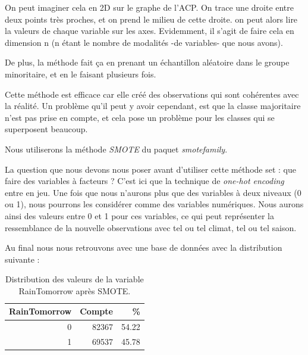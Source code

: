 \documentclass{article}
\begin{document}
On peut imaginer cela en 2D sur le graphe de l'ACP. On trace une droite entre deux points très proches, et on prend le milieu de cette droite. on peut alors lire la valeurs de chaque variable sur les axes. Evidemment, il s'agit de faire cela en dimension n (n étant le nombre de modalités -de variables- que nous avons).

De plus, la méthode fait ça en prenant un échantillon aléatoire dans le groupe minoritaire, et en le faisant plusieurs fois.

Cette méthode est efficace car elle créé des observations qui sont cohérentes avec la réalité. Un problème qu'il peut y avoir cependant, est que la classe majoritaire n'est pas prise en compte, et cela pose un problème pour les classes qui se superposent beaucoup. 

Nous utiliserons la méthode \emph{SMOTE} du paquet \emph{smotefamily}.

La question que nous devons nous poser avant d'utiliser cette méthode set : que faire des variables à facteurs ? C'est ici que la technique de \emph{one-hot encoding} entre en jeu. Une fois que nous n'aurons plus que des variables à deux niveaux (0 ou 1), nous pourrons les considérer comme des variables numériques. Nous aurons ainsi des valeurs entre 0 et 1 pour ces variables, ce qui peut représenter la ressemblance de la nouvelle observations avec tel ou tel climat, tel ou tel saison. 

Au final nous nous retrouvons avec une base de données avec la distribution suivante : 

\begin{table}[H]
    \centering
        \begin{tabular}{|rrr|}
            \hline
            RainTomorrow & Compte & \% \\ 
            \hline
            \hline
            0 & 82367 & 54.22 \\
            1 & 69537 & 45.78 \\
            \hline
        \end{tabular}
    \caption{Distribution des valeurs de la variable RainTomorrow après SMOTE.}
\end{table}
\end{document}
